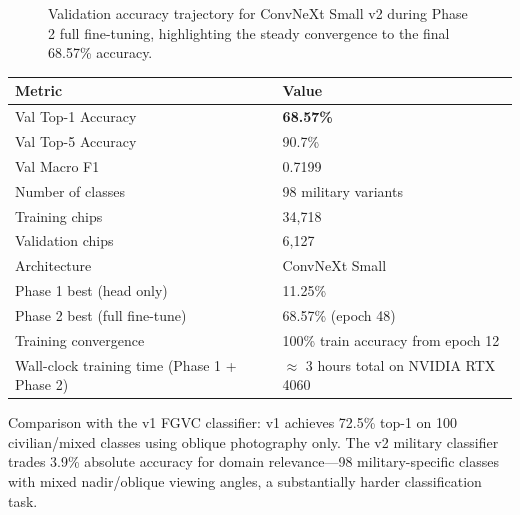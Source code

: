 \documentclass[11pt,a4paper]{article}
\begin{document}
\begin{figure}[htbp]
\centering
{}
\caption{Validation accuracy trajectory for ConvNeXt Small v2 during Phase 2 full fine-tuning, highlighting the steady convergence to the final 68.57\% accuracy.}
\label{fig:aircraft-acc-curve}
\end{figure}

\begin{longtable}[]{@{}ll@{}}
\toprule\noalign{}
Metric & Value \\
\midrule\noalign{}
\endhead
\bottomrule\noalign{}
\endlastfoot
Val Top-1 Accuracy & \textbf{68.57\%} \\
Val Top-5 Accuracy & 90.7\% \\
Val Macro F1 & 0.7199 \\
Number of classes & 98 military variants \\
Training chips & 34,718 \\
Validation chips & 6,127 \\
Architecture & ConvNeXt Small \\
Phase 1 best (head only) & 11.25\% \\
Phase 2 best (full fine-tune) & 68.57\% (epoch 48) \\
Training convergence & 100\% train accuracy from epoch 12 \\
Wall-clock training time (Phase 1 + Phase 2) & $\approx$ 3 hours total on NVIDIA RTX 4060 \\
\end{longtable}

Comparison with the v1 FGVC classifier: v1 achieves 72.5\% top-1 on 100 civilian/mixed classes using oblique photography only. The v2 military classifier trades 3.9\% absolute accuracy for domain relevance---98 military-specific classes with mixed nadir/oblique viewing angles, a substantially harder classification task.
\end{document}
